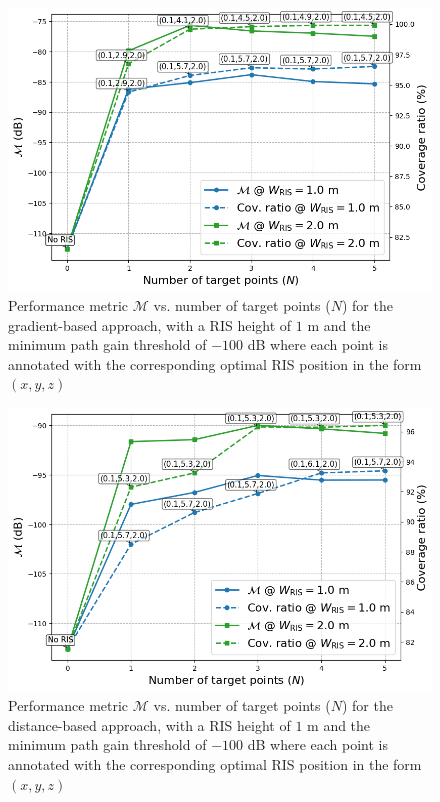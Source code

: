\documentclass{IEEEoj}
\begin{document}
\begin{figure}
	\centering
	\includegraphics[width=\linewidth]{Sim_Results/performance_and_coverage_vs_N_Gradient.png}
	\caption{Performance metric $\mathcal{M}$ vs. number of target points ($N$) for the gradient-based approach, with a RIS height of $1$ m and the minimum path gain threshold of $-100$ dB where each point is annotated with the corresponding optimal RIS position in the form $(x, y, z)$}
	\label{performance_and_coverage_vs_N_Gradient}
\end{figure}

\begin{figure}
	\centering
	\includegraphics[width=\linewidth]{Sim_Results/performance_and_coverage_vs_N_Distance.png}
	\caption{Performance metric $\mathcal{M}$ vs. number of target points ($N$) for the distance-based approach, with a RIS height of $1$ m and the minimum path gain threshold of $-100$ dB where each point is annotated with the corresponding optimal RIS position in the form $(x, y, z)$}
	\label{performance_and_coverage_vs_N_Distance}
\end{figure}
\end{document}

